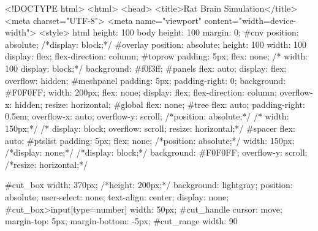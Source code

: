 <!DOCTYPE html>
<html>
    <head>
        <title>Rat Brain Simulation</title>
        <meta charset="UTF-8">
        <meta name="viewport" content="width=device-width">
        <style>
            html{
                height: 100%
            }
            body{
                height: 100%
                margin: 0;
            }
            #cnv{
                position: absolute;
                /*display: block;*/
            }
            #overlay{
                position: absolute;
                height: 100%
                width: 100%
                display: flex;
                flex-direction: column;
            }
            #toprow{
                padding: 5px;
                flex: none;
/*                width: 100%
                display: block;*/
                background: #f0f3ff;
            }
            #panels{
                flex: auto;
                display: flex;
                overflow: hidden;
            }
            #meshpanel{
                padding: 5px;
                padding-right: 0;
                background: #F0F0FF;
                width: 200px;
                flex: none;
                display: flex;
                flex-direction: column;
                overflow-x: hidden;
                resize: horizontal;
            }
            #global{
                flex: none;
            }
            #tree{
                flex: auto;
                padding-right: 0.5em;
                overflow-x: auto;
                overflow-y: scroll;
                /*position: absolute;*/
/*                width: 150px;*/
/*                display: block;
                overflow: scroll;
                resize: horizontal;*/
            }
            #spacer{
                flex: auto;
            }
            #ptslist{
                padding: 5px;
                flex: none;
                /*position: absolute;*/
                width: 150px;
                /*display: none;*/
                /*display: block;*/
                background: #F0F0FF;
                overflow-y: scroll;
                /*resize: horizontal;*/
            }
            
            #cut_box{
                width: 370px;
                /*height: 200px;*/
                background: lightgray;
                position: absolute;
                user-select: none;
                text-align: center;
                display: none;
            }
            #cut_box>input[type=number]{
                width: 50px;
            }
            #cut_handle{
                cursor: move;
                margin-top: 5px;
                margin-bottom: -5px;
            }
            #cut_range{
                width: 90%
            }
            
